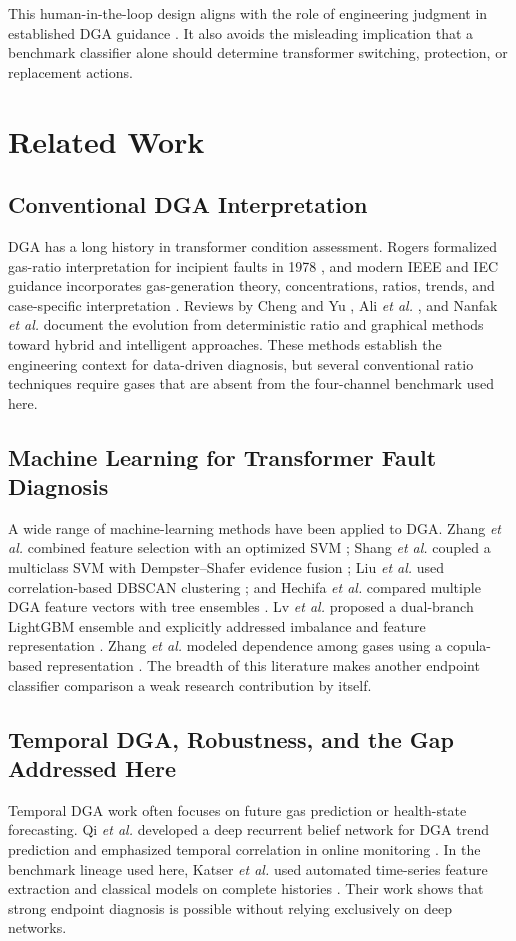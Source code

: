 \documentclass[conference]{IEEEtran}
\begin{document}
This human-in-the-loop design aligns with the role of engineering judgment in established DGA guidance \cite{ieeeC57104,iec60599}. It also avoids the misleading implication that a benchmark classifier alone should determine transformer switching, protection, or replacement actions.

\section{Related Work}
\subsection{Conventional DGA Interpretation}
DGA has a long history in transformer condition assessment. Rogers formalized gas-ratio interpretation for incipient faults in 1978 \cite{rogers1978}, and modern IEEE and IEC guidance incorporates gas-generation theory, concentrations, ratios, trends, and case-specific interpretation \cite{ieeeC57104,iec60599}. Reviews by Cheng and Yu \cite{cheng2018survey}, Ali \emph{et al.} \cite{ali2023review}, and Nanfak \emph{et al.} \cite{nanfak2024review} document the evolution from deterministic ratio and graphical methods toward hybrid and intelligent approaches. These methods establish the engineering context for data-driven diagnosis, but several conventional ratio techniques require gases that are absent from the four-channel benchmark used here.

\subsection{Machine Learning for Transformer Fault Diagnosis}
A wide range of machine-learning methods have been applied to DGA. Zhang \emph{et al.} combined feature selection with an optimized SVM \cite{zhang2019khsvm}; Shang \emph{et al.} coupled a multiclass SVM with Dempster--Shafer evidence fusion \cite{shang2019hmsvm}; Liu \emph{et al.} used correlation-based DBSCAN clustering \cite{liu2020dbscan}; and Hechifa \emph{et al.} compared multiple DGA feature vectors with tree ensembles \cite{hechifa2024ensemble}. Lv \emph{et al.} proposed a dual-branch LightGBM ensemble and explicitly addressed imbalance and feature representation \cite{lv2024lightgbm}. Zhang \emph{et al.} modeled dependence among gases using a copula-based representation \cite{zhang2022copula}. The breadth of this literature makes another endpoint classifier comparison a weak research contribution by itself.

\subsection{Temporal DGA, Robustness, and the Gap Addressed Here}
Temporal DGA work often focuses on future gas prediction or health-state forecasting. Qi \emph{et al.} developed a deep recurrent belief network for DGA trend prediction and emphasized temporal correlation in online monitoring \cite{qi2019drbn}. In the benchmark lineage used here, Katser \emph{et al.} used automated time-series feature extraction and classical models on complete histories \cite{katser2022,christ2018tsfresh}. Their work shows that strong endpoint diagnosis is possible without relying exclusively on deep networks.
\end{document}
